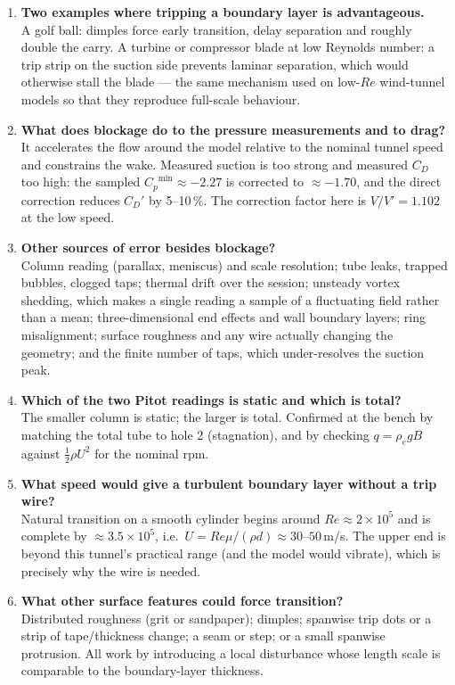 \documentclass[11pt,a4paper]{article}
\newcommand{\Cp}{\ensuremath{C_p}}
\newcommand{\CD}{\ensuremath{C_D}}
\newcommand{\ReD}{\ensuremath{\mathit{Re}}}
\begin{document}
\begin{enumerate}[leftmargin=1.6em,itemsep=4pt,topsep=2pt]
\item \textbf{Two examples where tripping a boundary layer is advantageous.}\\
A golf ball: dimples force early transition, delay separation and roughly double the carry.
A turbine or compressor blade at low Reynolds number: a trip strip on the suction side
prevents laminar separation, which would otherwise stall the blade --- the same mechanism
used on low-\ReD{} wind-tunnel models so that they reproduce full-scale behaviour.

\item \textbf{What does blockage do to the pressure measurements and to drag?}\\
It accelerates the flow around the model relative to the nominal tunnel speed and constrains
the wake. Measured suction is too strong and measured $\CD$ too high: the sampled
$\Cp^{\min} \approx -2.27$ is corrected to $\approx -1.70$, and the direct correction reduces
$\CD'$ by 5--10\,\%. The correction factor here is $V/V' = 1.102$ at the low speed.

\item \textbf{Other sources of error besides blockage?}\\
Column reading (parallax, meniscus) and scale resolution; tube leaks, trapped bubbles, clogged
taps; thermal drift over the session; unsteady vortex shedding, which makes a single reading
a sample of a fluctuating field rather than a mean; three-dimensional end effects and wall
boundary layers; ring misalignment; surface roughness and any wire actually changing the
geometry; and the finite number of taps, which under-resolves the suction peak.

\item \textbf{Which of the two Pitot readings is static and which is total?}\\
The smaller column is static; the larger is total. Confirmed at the bench by matching the
total tube to hole 2 (stagnation), and by checking $q = \rho_e g B$ against
$\tfrac12\rho U^2$ for the nominal rpm.

\item \textbf{What speed would give a turbulent boundary layer without a trip wire?}\\
Natural transition on a smooth cylinder begins around $\ReD \approx 2\times10^{5}$ and is
complete by $\approx 3.5\times10^{5}$, i.e.\ $U = \ReD\mu/(\rho d) \approx 30$--$50$\,m/s.
The upper end is beyond this tunnel's practical range (and the model would vibrate), which
is precisely why the wire is needed.

\item \textbf{What other surface features could force transition?}\\
Distributed roughness (grit or sandpaper); dimples; spanwise trip dots or a strip of
tape/thickness change; a seam or step; or a small spanwise protrusion. All work by
introducing a local disturbance whose length scale is comparable to the boundary-layer
thickness.

\end{enumerate}
\end{document}
